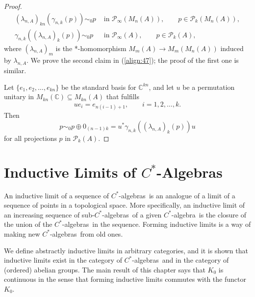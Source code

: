 \documentclass{book}
\def\cstar{\(C^*\)-algebra}
\def\cstars{\(C^*\)-algebras}
\begin{document}
\begin{proof}
  \begin{align}\label{align:47}
    (\lambda_{n,A})_{kn}(\gamma_{n,k}(p))\sim_0 p&\text{ in }\mathcal{P}_\infty(M_n(A)),\qquad p\in\mathcal{P}_k(M_n(A)),\\
    \gamma_{n,k}((\lambda_{n,A})_k(p))\sim_0 p&\text{ in }\mathcal{P}_\infty(A),\qquad p\in\mathcal{P}_k(A),
  \end{align}
  where \((\lambda_{n,A})_m\) is the *-homomorphism \(M_m(A)\to M_m(M_n(A))\) induced by
  \(\lambda_{n,A}\). We prove the second claim in (\ref{align:47}); the proof of the first one is similar.\par
    Let \(\{e_1,e_2,\ldots, e_{kn}\}\) be the standard basis for \(\mathbb{C}^{kn}\), and let \(u\) be a permutation
  unitary in \(M_{kn}(\mathbb{C})\subseteq M_{kn}(A)\) that fulfills
  \[
    ue_i=e_{n(i-1)+1},\qquad i=1,2,\ldots,k.
  \]
    Then \[p\sim_0 p\oplus 0_{(n-1)k}=u^*\gamma_{n,k}((\lambda_{n,A})_k(p))u\]
  for all projections \(p\) in \(\mathcal{P}_k(A)\).
\end{proof}

\chapter{Inductive Limits of \texorpdfstring{\(C^*\)}{C*}-Algebras}
An inductive limit of a sequence of \cstars\ is an analogue of a limit of a sequence
of points in a topological space. More specifically, an inductive limit of an increasing sequence
of sub-\cstars\ of a given \cstar\ is the closure of the union of the \cstars\ in  the sequence. Forming 
inductive limits is a way of making new \cstars\ from old ones.\par
We define abstractly inductive limits in arbitrary categories, and it is 
shown that inductive limits exist in the category of \cstars\ and in the category of (ordered) abelian groups.
The main result of this chapter says that \(K_0\) is continuous in the sense that forming
inductive limits commutes with the functor \(K_0\).
\end{document}
